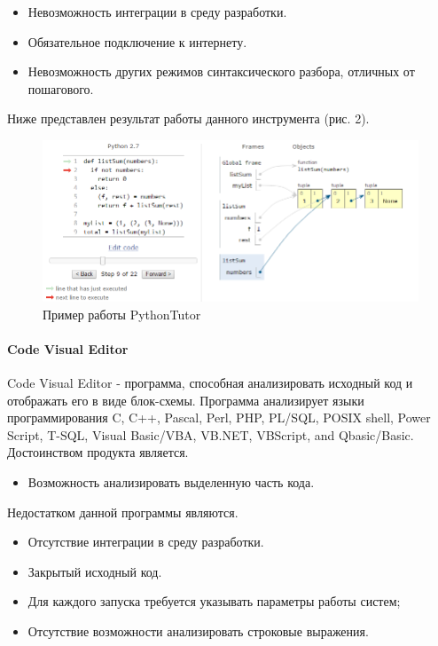 \documentclass{matmex-diploma}
\begin{document}
\begin{itemize}

        \item { Невозможность интеграции в среду разработки. }
        \item { Обязательное подключение к интернету. }
        \item { Невозможность других режимов синтаксического разбора, отличных от пошагового. }
        
 \end{itemize}

Ниже представлен результат работы данного инструмента (рис. 2).
\begin{figure}[h]
\label{Python}
\centering
\includegraphics{PythonTutor.PNG}
\caption{Пример работы PythonTutor}
\end{figure}


\paragraph {Code Visual Editor}
Code Visual Editor - программа, способная анализировать исходный код и отображать его в виде блок-схемы. Программа анализирует языки программирования C, C++, Pascal, Perl, PHP, PL/SQL, POSIX shell, Power Script, T-SQL, Visual Basic/VBA, VB.NET, VBScript, and Qbasic/Basic.   \\
Достоинством продукта является.

\begin{itemize}

        \item { Возможность анализировать выделенную часть кода. }
        
 \end{itemize}
Недостатком данной программы являются.

\begin{itemize}

        \item { Отсутствие интеграции в среду разработки. }
        \item { Закрытый исходный код. }
        \item { Для каждого запуска требуется указывать параметры работы систем; }
        \item { Отсутствие возможности анализировать строковые выражения. }
        
 \end{itemize}
\end{document}
